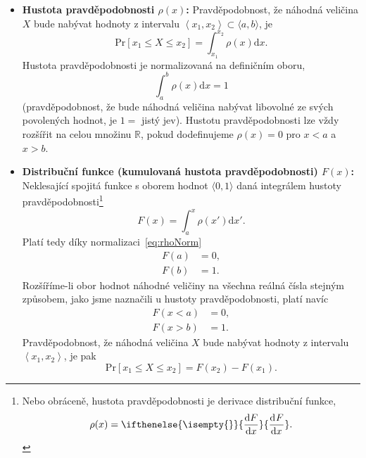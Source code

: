 \documentclass[a4paper,11pt,twoside]{article}
\renewcommand{\d}{\mathrm{d}}           %
\newcommand{\derivative}[3][]{\ifthenelse{\isempty{#1}}	    %
	{\frac{\d{#2}}{\d{#3}}}
	{\frac{\d^{#1}{#2}}{\d{#3}^{#1}}}
}
\def\probability#1{\mathrm{Pr}\left[#1\right]}
\theoremstyle{red}
\theoremstyle{green}
\begin{document}
        \begin{itemize}
            \item {\bf Hustota pravděpodobnosti  $\rho(x)$:}
                Pravděpodobnost, že náhodná veličina $X$ bude nabývat hodnoty z intervalu $\left\langle x_{1},x_{2}\right\rangle\subset\langle a,b\rangle$, je
                \begin{equation}
                    \probability{x_{1}\le X\le x_{2}}=\int_{x_{1}}^{x_{2}}\rho(x)\d x.
                \end{equation}
                Hustota pravděpodobnosti je normalizovaná na definičním oboru,
                \begin{equation}\label{eq:rhoNorm}
                    \int_{a}^{b}\rho(x)\d x=1
                \end{equation}
                (pravděpodobnost, že bude náhodná veličina nabývat libovolné ze svých povolených hodnot, je $1=$ jistý jev).
                Hustotu pravděpodobnosti lze vždy rozšířit na celou množinu $\mathbb{R}$, pokud dodefinujeme $\rho(x)=0$ pro $x<a$ a $x>b$.

            \item {\bf Distribuční funkce (kumulovaná hustota pravděpodobnosti) $F(x)$:} 
                Neklesající spojitá funkce s oborem hodnot $\langle 0,1\rangle$ daná integrálem hustoty pravděpodobnosti\footnote{
                    Nebo obráceně, hustota pravděpodobnosti je derivace distribuční funkce,
                    \begin{equation}
                        \label{eq:rhoF}
                        \rho(x)=\derivative{F}{x}.
                    \end{equation}
                }
                \begin{equation}
                    F(x)=\int_{a}^{x}\rho(x')\d x'.
                \end{equation}
                Platí tedy díky normalizaci~\eqref{eq:rhoNorm}
                \begin{align*}
                    F(a)&=0,\\
                    F(b)&=1.
                \end{align*}
                Rozšíříme-li obor hodnot náhodné veličiny na všechna reálná čísla stejným způsobem, jako jsme naznačili u hustoty pravděpodobnosti, platí navíc
                \begin{align*}
                    F(x<a)&=0,\\
                    F(x>b)&=1.
                \end{align*}
                Pravděpodobnost, že náhodná veličina $X$ bude nabývat hodnoty z intervalu $\left\langle x_{1},x_{2}\right\rangle$, je pak
                \begin{equation}
                    \probability{x_{1}\le X\le x_{2}}=F(x_{2})-F(x_{1}).
                \end{equation}


\end{itemize}
\end{document}
